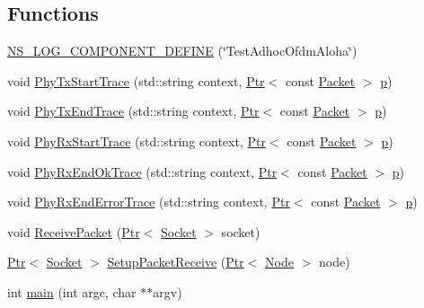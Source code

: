 \subsection*{Functions}
\begin{DoxyCompactItemize}
\item 
\hyperlink{adhoc-aloha-ideal-phy_8cc_a45f038bb3b5482b2b7f9f5d78d81273b}{N\+S\+\_\+\+L\+O\+G\+\_\+\+C\+O\+M\+P\+O\+N\+E\+N\+T\+\_\+\+D\+E\+F\+I\+NE} (\char`\"{}Test\+Adhoc\+Ofdm\+Aloha\char`\"{})
\item 
void \hyperlink{adhoc-aloha-ideal-phy_8cc_aef85126bd85f29842c7db47da7ab881a}{Phy\+Tx\+Start\+Trace} (std\+::string context, \hyperlink{classns3_1_1Ptr}{Ptr}$<$ const \hyperlink{classns3_1_1Packet}{Packet} $>$ \hyperlink{lte__link__budget__x2__handover__measures_8m_ac9de518908a968428863f829398a4e62}{p})
\item 
void \hyperlink{adhoc-aloha-ideal-phy_8cc_a1b644fd41107149725fc7c3af0f3ccdf}{Phy\+Tx\+End\+Trace} (std\+::string context, \hyperlink{classns3_1_1Ptr}{Ptr}$<$ const \hyperlink{classns3_1_1Packet}{Packet} $>$ \hyperlink{lte__link__budget__x2__handover__measures_8m_ac9de518908a968428863f829398a4e62}{p})
\item 
void \hyperlink{adhoc-aloha-ideal-phy_8cc_a51ce42e0529cf922b9fa1274522f0894}{Phy\+Rx\+Start\+Trace} (std\+::string context, \hyperlink{classns3_1_1Ptr}{Ptr}$<$ const \hyperlink{classns3_1_1Packet}{Packet} $>$ \hyperlink{lte__link__budget__x2__handover__measures_8m_ac9de518908a968428863f829398a4e62}{p})
\item 
void \hyperlink{adhoc-aloha-ideal-phy_8cc_abe11a97645f01a1213944fb2cbabeb1a}{Phy\+Rx\+End\+Ok\+Trace} (std\+::string context, \hyperlink{classns3_1_1Ptr}{Ptr}$<$ const \hyperlink{classns3_1_1Packet}{Packet} $>$ \hyperlink{lte__link__budget__x2__handover__measures_8m_ac9de518908a968428863f829398a4e62}{p})
\item 
void \hyperlink{adhoc-aloha-ideal-phy_8cc_a515d5357cc68bf748507f70c86651488}{Phy\+Rx\+End\+Error\+Trace} (std\+::string context, \hyperlink{classns3_1_1Ptr}{Ptr}$<$ const \hyperlink{classns3_1_1Packet}{Packet} $>$ \hyperlink{lte__link__budget__x2__handover__measures_8m_ac9de518908a968428863f829398a4e62}{p})
\item 
void \hyperlink{adhoc-aloha-ideal-phy_8cc_a80dc0d980be124d8d5c4ee0b7943bfae}{Receive\+Packet} (\hyperlink{classns3_1_1Ptr}{Ptr}$<$ \hyperlink{classns3_1_1Socket}{Socket} $>$ socket)
\item 
\hyperlink{classns3_1_1Ptr}{Ptr}$<$ \hyperlink{classns3_1_1Socket}{Socket} $>$ \hyperlink{adhoc-aloha-ideal-phy_8cc_a3858f39b0c1d0e52120fef78a82673cb}{Setup\+Packet\+Receive} (\hyperlink{classns3_1_1Ptr}{Ptr}$<$ \hyperlink{classns3_1_1Node}{Node} $>$ node)
\item 
int \hyperlink{adhoc-aloha-ideal-phy_8cc_a3c04138a5bfe5d72780bb7e82a18e627}{main} (int argc, char $\ast$$\ast$argv)
\end{DoxyCompactItemize}
